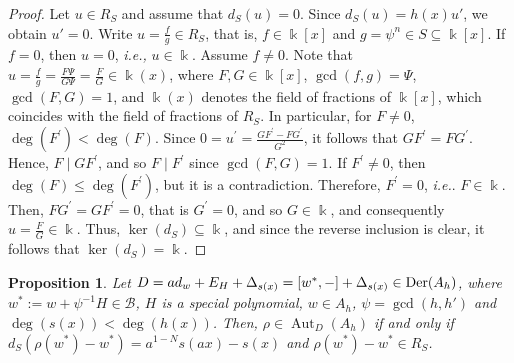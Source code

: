 \documentclass{article}
\numberwithin{equation}{section}\theoremstyle{plain}
\newtheorem{proposition}[theorem]{Proposition}
\newcommand{\der}{{\rm Der}}
\DeclareMathOperator{\Aut}{Aut}
\begin{document}
\begin{proof}
 Let $u\in R_S$ and assume that $d_S(u)=0$.
Since $d_S(u)=h(x)u'$, we obtain $u'=0$.
Write $u=\frac{f}{g} \in R_S$, that is, $f\in\Bbbk[x]$ and $g = \psi^n \in S \subseteq\Bbbk[x]$.
If $f=0$, then $u=0$, \emph{i.e.,} $u \in \Bbbk$.
Assume $f \neq 0$.
Note that $u=\frac{f}{g} = \frac{F \Psi}{G \Psi} = \frac{F}{G} \in \Bbbk(x)$, where $F, G \in \Bbbk[x]$, $\gcd(f,g) = \Psi$, $\gcd(F,G)=1$, and $\Bbbk(x)$ denotes the field of fractions of $\Bbbk[x]$, which coincides with the field of fractions of $R_S$.
In particular, for $F \neq 0$, $\deg(F^\prime) < \deg(F)$.
Since $0 = u ^\prime = \frac{G F^\prime - F G^\prime}{G^2}$, it follows that $G F^\prime = F G^\prime$.
Hence, $F \mid G F^\prime$, and so $F \mid F^\prime$ since $\gcd(F,G)=1$.
If $F^\prime \neq 0$, then $\deg(F) \leq \deg(F^\prime)$, but it is a contradiction.
Therefore, $F^\prime = 0$, \emph{i.e.}. $F \in \Bbbk$.
Then, $F G^\prime =G F^\prime = 0$, that is $G^\prime =0$, and so $G \in \Bbbk$, and consequently $u = \frac{F}{G} \in \Bbbk$.
Thus, $\ker(d_S) \subseteq \Bbbk$, and since the reverse inclusion is clear, it follows that $\ker(d_S)=\Bbbk$.
\end{proof}

\begin{proposition} \label{classificacao}
Let $D=ad_w+E_H+\Delta_{s(x)}=[w^\ast,-]+\Delta_{s(x)} \in \der(A_h)$, where $w^\ast:=w+\psi^{-1}H \in \mathcal B$, $H$ is a special polynomial, $w\in A_h$, $\psi=\gcd(h,h')$ and $\deg (s(x)) < \deg (h(x))$.
Then, $\rho \in \Aut_D(A_h)$ if and only if $d_S(\rho(w^\ast)-w^\ast)=a^{1-N}s(ax)-s(x)$ and $\rho(w^\ast)-w^\ast \in R_S$.
\end{proposition}
\end{document}
